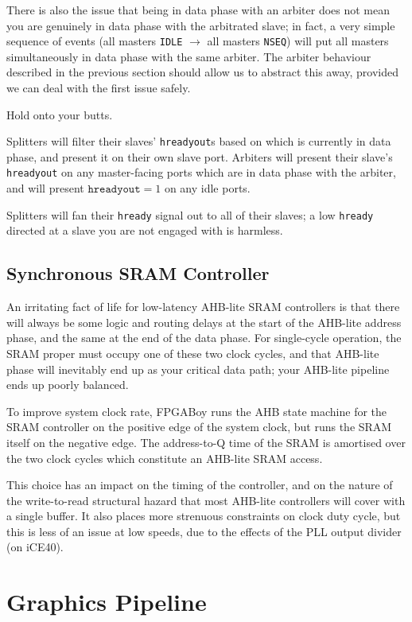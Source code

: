 \documentclass{article}
\begin{document}
There is also the issue that being in data phase with an arbiter does not mean you are genuinely in data phase with the arbitrated slave; in fact, a very simple sequence of events (all masters \texttt{IDLE} $\to$ all masters \texttt{NSEQ}) will put all masters simultaneously in data phase with the same arbiter. The arbiter behaviour described in the previous section should allow us to abstract this away, provided we can deal with the first issue safely.

Hold onto your butts.

Splitters will filter their slaves' \texttt{hreadyout}s based on which is currently in data phase, and present it on their own slave port. Arbiters will present their slave's \texttt{hreadyout} on any master-facing ports which are in data phase with the arbiter, and will present $\texttt{hreadyout} = 1$ on any idle ports.

Splitters will fan their \texttt{hready} signal out to all of their slaves; a low \texttt{hready} directed at a slave you are not engaged with is harmless.

\subsection{Synchronous SRAM Controller}

An irritating fact of life for low-latency AHB-lite SRAM controllers is that there will always be some logic and routing delays at the start of the AHB-lite address phase, and the same at the end of the data phase. For single-cycle operation, the SRAM proper must occupy one of these two clock cycles, and that AHB-lite phase will inevitably end up as your critical data path; your AHB-lite pipeline ends up poorly balanced.

To improve system clock rate, FPGABoy runs the AHB state machine for the SRAM controller on the positive edge of the system clock, but runs the SRAM itself on the negative edge. The address-to-Q time of the SRAM is amortised over the two clock cycles which constitute an AHB-lite SRAM access.

This choice has an impact on the timing of the controller, and on the nature of the write-to-read structural hazard that most AHB-lite controllers will cover with a single buffer. It also places more strenuous constraints on clock duty cycle, but this is less of an issue at low speeds, due to the effects of the PLL output divider (on iCE40).

\section{Graphics Pipeline}
\end{document}
